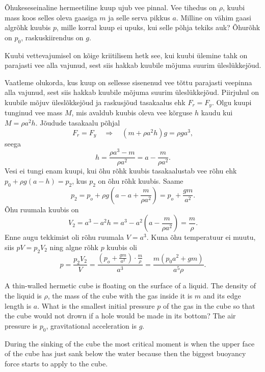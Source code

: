 
Õhukeseseinaline hermeetiline kuup ujub vee pinnal. Vee tihedus on $\rho$, kuubi mass koos selles oleva gaasiga $m$ ja selle serva pikkus $a$. Milline on vähim gaasi algrõhk kuubis $p$, mille korral kuup ei upuks, kui selle põhja tekiks auk? Õhurõhk on $p_0$, raskuskiirendus on $g$.

\hint
Kuubi vettevajumisel on kõige kriitilisem hetk see, kui kuubi ülemine tahk on parajasti vee alla vajunud, sest siis hakkab kuubile mõjuma suurim üleslükkejõud.

\solu
Vaatleme olukorda, kus kuup on sellesse sisenenud vee tõttu parajasti veepinna alla vajunud, sest siis hakkab kuubile mõjuma suurim üleslükkejõud. Piirjuhul on kuubile mõjuv üleslõkkejõud ja raskusjõud tasakaalus ehk $F_r = F_y$. Olgu kuupi tunginud vee mass $M$, mis avaldub kuubis oleva vee kõrguse $h$ kaudu kui $M = \rho a^2h$. Jõudude tasakaalu põhjal
\[
F_r = F_y \quad\Rightarrow\quad (m + \rho a^2h)g=\rho ga^3,
\]
seega
\[
h = \frac{\rho a^3 - m}{\rho a^2} = a - \frac{m}{\rho a^2}.
\]
Vesi ei tungi enam kuupi, kui õhu rõhk kuubis tasakaalustab vee rõhu ehk $p_0 + \rho g(a-h) = p_2$, kus $p_2$ on õhu rõhk kuubis. Saame
\[
p_2 = p_o + \rho g\left(a - a + \frac{m}{\rho a^2}\right) = p_o + \frac{gm}{a^2}.
\]
Õhu ruumala kuubis on
\[
V_2 = a^3 - a^2h = a^3 - a^2\left(a - \frac{m}{\rho a^2}\right) = \frac{m}{\rho}.
\]
Enne augu tekkimist oli rõhu ruumala $V=a^3$. Kuna õhu temperatuur ei muutu, siis $pV = p_2V_2$ ning algne rõhk $p$ kuubis oli
\[
p = \frac{p_2V_2}{V} = \frac{ \left( p_o + \frac{gm}{a^2} \right) \cdot \frac{m}{\rho}}{a^3} = \frac{m(p_0a^2 + gm)}{a^5\rho}.
\]

A thin-walled hermetic cube is floating on the surface of a liquid. The density of the liquid is $\rho$, the mass of the cube with the gas inside it is $m$ and its edge length is $a$. What is the smallest initial pressure $p$ of the gas in the cube so that the cube would not drown if a hole would be made in its bottom? The air pressure is $p_0$, gravitational acceleration is $g$.

\hinteng
During the sinking of the cube the most critical moment is when the upper face of the cube has just sank below the water because then the biggest buoyancy force starts to apply to the cube.

